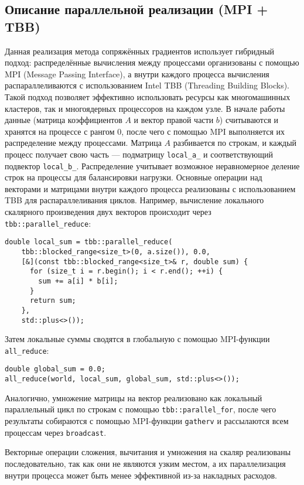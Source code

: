 \documentclass[12pt]{article}
\begin{document}
\subsection{Описание параллельной реализации (MPI + TBB)}

\hspace*{1.35em}Данная реализация метода сопряжённых градиентов использует гибридный подход: распределённые вычисления между процессами организованы с помощью MPI (Message Passing Interface), а внутри каждого процесса вычисления распараллеливаются с использованием Intel TBB (Threading Building Blocks).
Такой подход позволяет эффективно использовать ресурсы как многомашинных кластеров, так и многоядерных процессоров на каждом узле.
В начале работы данные (матрица коэффициентов \( A \) и вектор правой части \( b \)) считываются и хранятся на процессе с рангом 0, после чего с помощью MPI выполняется их распределение между процессами. Матрица \( A \) разбивается по строкам, и каждый процесс получает свою часть — подматрицу \texttt{local\_a\_} и соответствующий подвектор \texttt{local\_b\_}.
Распределение учитывает возможное неравномерное деление строк на процессы для балансировки нагрузки.
Основные операции над векторами и матрицами внутри каждого процесса реализованы с использованием TBB для распараллеливания циклов. Например, вычисление локального скалярного произведения двух векторов происходит через \texttt{tbb::parallel\_reduce}:

\begin{verbatim}
double local_sum = tbb::parallel_reduce(
    tbb::blocked_range<size_t>(0, a.size()), 0.0,
    [&](const tbb::blocked_range<size_t>& r, double sum) {
      for (size_t i = r.begin(); i < r.end(); ++i) {
        sum += a[i] * b[i];
      }
      return sum;
    },
    std::plus<>());
\end{verbatim}

Затем локальные суммы сводятся в глобальную с помощью MPI-функции \texttt{all\_reduce}:

\begin{verbatim}
double global_sum = 0.0;
all_reduce(world, local_sum, global_sum, std::plus<>());
\end{verbatim}

Аналогично, умножение матрицы на вектор реализовано как локальный параллельный цикл по строкам с помощью \texttt{tbb::parallel\_for}, после чего результаты собираются с помощью MPI-функции \texttt{gatherv} и рассылаются всем процессам через \texttt{broadcast}.

Векторные операции сложения, вычитания и умножения на скаляр реализованы последовательно, так как они не являются узким местом, а их параллелизация внутри процесса может быть менее эффективной из-за накладных расходов.
\end{document}
